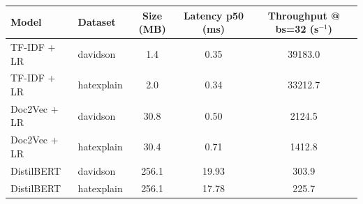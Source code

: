 \begin{tabular}{llccc}
\toprule
Model & Dataset & Size (MB) & Latency p50 (ms) & Throughput @ bs=32 (s$^{-1}$) \\
\midrule
TF-IDF + LR & davidson & 1.4 & 0.35 & 39183.0 \\
TF-IDF + LR & hatexplain & 2.0 & 0.34 & 33212.7 \\
Doc2Vec + LR & davidson & 30.8 & 0.50 & 2124.5 \\
Doc2Vec + LR & hatexplain & 30.4 & 0.71 & 1412.8 \\
DistilBERT & davidson & 256.1 & 19.93 & 303.9 \\
DistilBERT & hatexplain & 256.1 & 17.78 & 225.7 \\
\bottomrule
\end{tabular}

